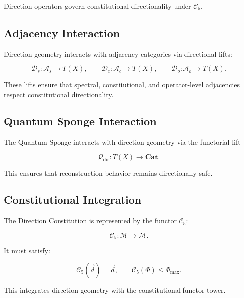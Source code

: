 Direction operators govern constitutional directionality under $\mathcal{C}_5$.


\subsection{Adjacency Interaction}

Direction geometry interacts with adjacency categories via directional lifts:

\[
\mathcal{D}_s : \mathcal{A}_s \to T(X), \qquad
\mathcal{D}_c : \mathcal{A}_c \to T(X), \qquad
\mathcal{D}_o : \mathcal{A}_o \to T(X).
\]

These lifts ensure that spectral, constitutional, and operator-level
adjacencies respect constitutional directionality.


\subsection{Quantum Sponge Interaction}

The Quantum Sponge interacts with direction geometry via the functorial lift

\[
\mathcal{Q}_{\mathrm{dir}} :
T(X) \to \mathbf{Cat}.
\]

This ensures that reconstruction behavior remains directionally safe.


\subsection{Constitutional Integration}

The Direction Constitution is represented by the functor $\mathcal{C}_5$:

\[
\mathcal{C}_5 : \mathcal{M} \to \mathcal{M}.
\]

It must satisfy:

\[
\mathcal{C}_5(\vec{d}) = \vec{d}, \qquad
\mathcal{C}_5(\Phi) \le \Phi_{\max}.
\]

This integrates direction geometry with the constitutional functor tower.


